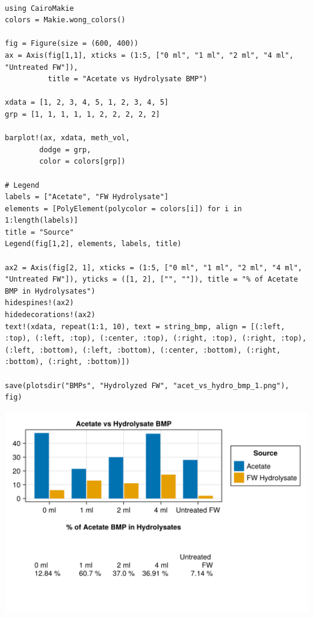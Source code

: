 \documentclass[11pt]{article}
\begin{document}
\begin{verbatim}

using CairoMakie
colors = Makie.wong_colors()

fig = Figure(size = (600, 400))
ax = Axis(fig[1,1], xticks = (1:5, ["0 ml", "1 ml", "2 ml", "4 ml", "Untreated FW"]),
          title = "Acetate vs Hydrolysate BMP")

xdata = [1, 2, 3, 4, 5, 1, 2, 3, 4, 5]
grp = [1, 1, 1, 1, 1, 2, 2, 2, 2, 2]

barplot!(ax, xdata, meth_vol,
        dodge = grp,
        color = colors[grp])

# Legend
labels = ["Acetate", "FW Hydrolysate"]
elements = [PolyElement(polycolor = colors[i]) for i in 1:length(labels)]
title = "Source"
Legend(fig[1,2], elements, labels, title)

ax2 = Axis(fig[2, 1], xticks = (1:5, ["0 ml", "1 ml", "2 ml", "4 ml", "Untreated FW"]), yticks = ([1, 2], ["", ""]), title = "% of Acetate BMP in Hydrolysates")
hidespines!(ax2)
hidedecorations!(ax2)
text!(xdata, repeat(1:1, 10), text = string_bmp, align = [(:left, :top), (:left, :top), (:center, :top), (:right, :top), (:right, :top), (:left, :bottom), (:left, :bottom), (:center, :bottom), (:right, :bottom), (:right, :bottom)])

save(plotsdir("BMPs", "Hydrolyzed FW", "acet_vs_hydro_bmp_1.png"), fig)
\end{verbatim}

\begin{center}
\includegraphics[width=.9\linewidth]{../plots/BMPs/Hydrolyzed FW/acet_vs_hydro_bmp_1.png}
\end{center}
\end{document}
